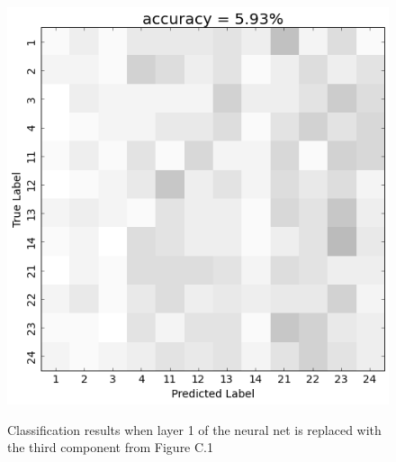 \begin{figure}[htbp] 
  \begin{center}
    \includegraphics[scale=0.5]{Figures/PC2_confusion}
   \\\vspace{-0.8em}
    \caption{Classification results when layer 1 of the neural net is replaced with the third component from Figure C.1}
    \label{fig:PC2_confusion}
  \end{center}
\end{figure}
